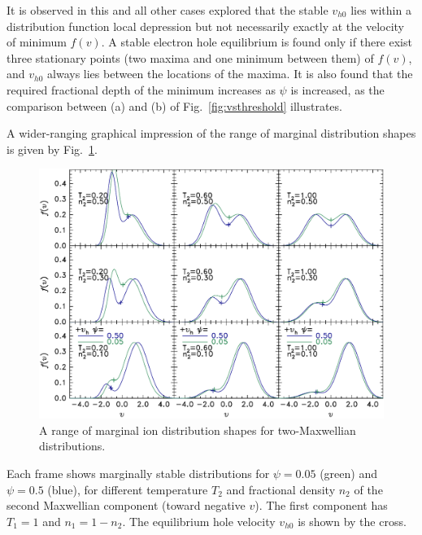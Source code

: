 \documentclass[12pt]{article}
\begin{document}
It is observed in this and all other cases explored that the stable
$v_{h0}$ lies within a distribution function local depression but not
necessarily exactly at the velocity of minimum $f(v)$.
A stable electron hole equilibrium is found only if there exist three
stationary points (two maxima and one minimum between them) of $f(v)$,
and $v_{h0}$ always lies between the locations of the maxima. It is
also found that the required fractional depth of the minimum increases
as $\psi$ is increased, as the comparison between (a) and (b) of Fig.\
\ref{fig:vsthreshold} illustrates.

A wider-ranging graphical impression of the range of marginal
distribution shapes is given by Fig.\ \ref{fig:shapes}.
\begin{figure}[htp]
  \centering
  \includegraphics[width=.8\hsize]{shapes}
  \caption{A range of marginal ion distribution shapes for two-Maxwellian
    distributions.}
  \label{fig:shapes}
\end{figure}
Each frame shows marginally stable distributions for $\psi=0.05$ (green) and
$\psi=0.5$ (blue), for different temperature $T_2$ and fractional
density $n_2$ of the second Maxwellian component (toward negative
$v$). The first component has $T_1=1$ and $n_1=1-n_2$. The equilibrium hole
velocity $v_{h0}$ is shown by the cross.
\end{document}
